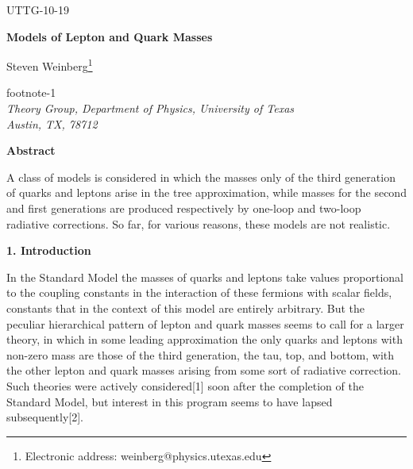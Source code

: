  


\def\fnote#1#2{\begingroup\def\thefootnote{#1}\footnote{#2}\addtocounter
{footnote}{-1}\endgroup}
\def\BM#1{\mbox{\boldmath{$#1$}}}





\hfill{UTTG-10-19}


\vspace{20pt}


\begin{center}
{\large {\bf { Models of Lepton and Quark Masses}}}


\vspace{20pt}

Steven Weinberg\fnote{*}{Electronic address:
weinberg@physics.utexas.edu}\\
{\em Theory Group, Department of Physics, University of
Texas\\
Austin, TX, 78712}





\vspace{30pt}

\noindent
{\bf Abstract}
\end{center}


A class of models is considered in which the masses only of the third generation of quarks and leptons arise in the tree approximation, while masses for the second and first generations are produced respectively by one-loop and two-loop radiative corrections.  So far, for various reasons, these models are not realistic.





\vfill

\pagebreak

\begin{center}
{\bf 1. Introduction}
\end{center}


In the Standard Model the masses of quarks and leptons take values proportional to the coupling constants in the interaction of these fermions with scalar fields, constants that in the context of this model are entirely arbitrary.  But the peculiar hierarchical pattern of lepton and quark masses seems to call for a larger theory, in which in some leading approximation the only quarks and leptons with non-zero mass are those of the third generation, the tau, top, and bottom, with the other lepton and quark masses arising from some sort of radiative correction.  Such theories were actively considered[1]	  soon after the completion of the Standard Model, but interest in this program seems to have lapsed subsequently[2].  

